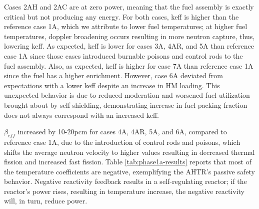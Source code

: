 Cases 2AH and 2AC are at zero power, meaning that the fuel assembly is exactly 
critical but not producing any energy. 
For both cases, keff is higher than the reference case 1A, which we attribute to 
lower fuel temperatures; at higher fuel temperatures, doppler broadening occurs 
resulting in more neutron capture, thus, lowering keff. 
As expected, keff is lower for cases 3A, 4AR, and 5A than reference case 
1A since those cases introduced burnable poisons and control rods to the fuel 
assembly. 
Also, as expected, keff is higher for case 7A than reference case 1A since 
the fuel has a higher enrichment. 
However, case 6A deviated from expectations with a lower keff despite an increase 
in \gls{HM} loading. 
This unexpected behavior is due to reduced moderation and worsened fuel 
utilization brought about by self-shielding, demonstrating increase in 
fuel packing fraction does not always correspond with an increased keff. 

$\beta_{eff}$ increased by 10-20pcm for cases 4A, 4AR, 5A, and 6A, compared to
reference case 1A, due to the introduction of control rods and poisons, which 
shifts the average neutron velocity to higher values resulting in decreased
thermal fission and increased fast fission\cite{torabi_neutronic_2018}.
Table \ref{tab:phase1a-results} reports that most of the temperature coefficients 
are negative, exemplifying the \gls{AHTR}'s passive safety behavior. 
Negative reactivity feedback results in a self-regulating reactor; if the reactor's 
power rises, resulting in temperature increase, the negative reactivity will, 
in turn, reduce power. 

